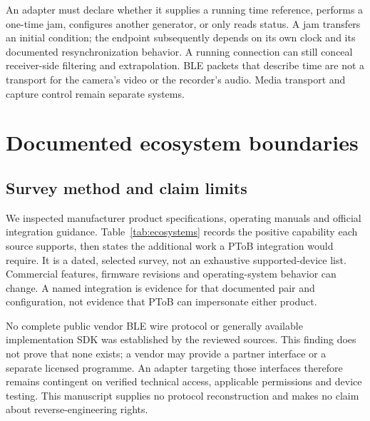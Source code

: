 \documentclass[11pt,letterpaper]{article}
\begin{document}
An adapter must declare whether it supplies a running time reference, performs a one-time jam, configures another generator, or only reads status. A jam transfers an initial condition; the endpoint subsequently depends on its own clock and its documented resynchronization behavior. A running connection can still conceal receiver-side filtering and extrapolation. BLE packets that describe time are not a transport for the camera's video or the recorder's audio. Media transport and capture control remain separate systems.

\section{Documented ecosystem boundaries}\label{sec:compatibility}
\subsection{Survey method and claim limits}
We inspected manufacturer product specifications, operating manuals and official integration guidance. Table~\ref{tab:ecosystems} records the positive capability each source supports, then states the additional work a PToB integration would require. It is a dated, selected survey, not an exhaustive supported-device list. Commercial features, firmware revisions and operating-system behavior can change. A named integration is evidence for that documented pair and configuration, not evidence that PToB can impersonate either product.

No complete public vendor BLE wire protocol or generally available implementation SDK was established by the reviewed sources. This finding does not prove that none exists; a vendor may provide a partner interface or a separate licensed programme. An adapter targeting those interfaces therefore remains contingent on verified technical access, applicable permissions and device testing. This manuscript supplies no protocol reconstruction and makes no claim about reverse-engineering rights.
\end{document}
